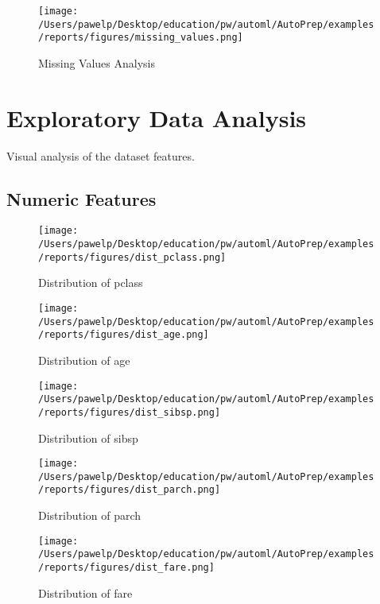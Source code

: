 \documentclass{article}%
\begin{document}
%


\begin{figure}[H]%
\centering%
\texttt{[image: /Users/pawelp/Desktop/education/pw/automl/AutoPrep/examples/reports/figures/missing\_values.png]}%
\caption{Missing Values Analysis}%
\end{figure}

%
\section{Exploratory Data Analysis}%
\label{sec:ExploratoryDataAnalysis}%
Visual analysis of the dataset features.

%
\subsection{Numeric Features}%
\label{subsec:NumericFeatures}%

%


\begin{figure}[H]%
\centering%
\texttt{[image: /Users/pawelp/Desktop/education/pw/automl/AutoPrep/examples/reports/figures/dist\_pclass.png]}%
\caption{Distribution of pclass}%
\end{figure}

%


\begin{figure}[H]%
\centering%
\texttt{[image: /Users/pawelp/Desktop/education/pw/automl/AutoPrep/examples/reports/figures/dist\_age.png]}%
\caption{Distribution of age}%
\end{figure}

%


\begin{figure}[H]%
\centering%
\texttt{[image: /Users/pawelp/Desktop/education/pw/automl/AutoPrep/examples/reports/figures/dist\_sibsp.png]}%
\caption{Distribution of sibsp}%
\end{figure}

%


\begin{figure}[H]%
\centering%
\texttt{[image: /Users/pawelp/Desktop/education/pw/automl/AutoPrep/examples/reports/figures/dist\_parch.png]}%
\caption{Distribution of parch}%
\end{figure}

%


\begin{figure}[H]%
\centering%
\texttt{[image: /Users/pawelp/Desktop/education/pw/automl/AutoPrep/examples/reports/figures/dist\_fare.png]}%
\caption{Distribution of fare}%
\end{figure}
\end{document}
